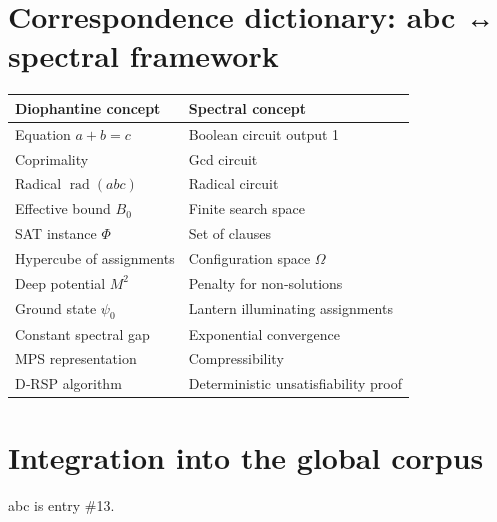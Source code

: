 \documentclass[11pt,a4paper]{article}
\begin{document}
\section{Correspondence dictionary: abc ↔ spectral framework}

\begin{center}
\small
\begin{tabular}{@{}l|l@{}}
\toprule
\textbf{Diophantine concept} & \textbf{Spectral concept} \\
\midrule
Equation $a + b = c$ & Boolean circuit output 1 \\
Coprimality & Gcd circuit \\
Radical $\operatorname{rad}(abc)$ & Radical circuit \\
Effective bound $B_0$ & Finite search space \\
SAT instance $\Phi$ & Set of clauses \\
Hypercube of assignments & Configuration space $\Omega$ \\
Deep potential $M^2$ & Penalty for non‑solutions \\
Ground state $\psi_0$ & Lantern illuminating assignments \\
Constant spectral gap & Exponential convergence \\
MPS representation & Compressibility \\
D‑RSP algorithm & Deterministic unsatisfiability proof \\
\bottomrule
\end{tabular}
\end{center}

\section{Integration into the global corpus}

abc is entry \#13.
\end{document}
